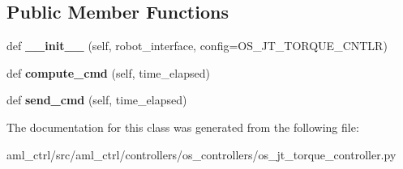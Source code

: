 \subsection*{Public Member Functions}
\begin{DoxyCompactItemize}
\item 
\hypertarget{classaml__ctrl_1_1controllers_1_1os__controllers_1_1os__jt__torque__controller_1_1_o_s_j_t_torque_controller_a6a9057f3af216e5baffb06f788cb3a7a}{}\label{classaml__ctrl_1_1controllers_1_1os__controllers_1_1os__jt__torque__controller_1_1_o_s_j_t_torque_controller_a6a9057f3af216e5baffb06f788cb3a7a} 
def {\bfseries \+\_\+\+\_\+init\+\_\+\+\_\+} (self, robot\+\_\+interface, config=O\+S\+\_\+\+J\+T\+\_\+\+T\+O\+R\+Q\+U\+E\+\_\+\+C\+N\+T\+LR)
\item 
\hypertarget{classaml__ctrl_1_1controllers_1_1os__controllers_1_1os__jt__torque__controller_1_1_o_s_j_t_torque_controller_ae53a96d9c5ad714a5f2bd8e7584093e7}{}\label{classaml__ctrl_1_1controllers_1_1os__controllers_1_1os__jt__torque__controller_1_1_o_s_j_t_torque_controller_ae53a96d9c5ad714a5f2bd8e7584093e7} 
def {\bfseries compute\+\_\+cmd} (self, time\+\_\+elapsed)
\item 
\hypertarget{classaml__ctrl_1_1controllers_1_1os__controllers_1_1os__jt__torque__controller_1_1_o_s_j_t_torque_controller_afe7e4b35075932fbaac675595bc94e55}{}\label{classaml__ctrl_1_1controllers_1_1os__controllers_1_1os__jt__torque__controller_1_1_o_s_j_t_torque_controller_afe7e4b35075932fbaac675595bc94e55} 
def {\bfseries send\+\_\+cmd} (self, time\+\_\+elapsed)
\end{DoxyCompactItemize}


The documentation for this class was generated from the following file\+:\begin{DoxyCompactItemize}
\item 
aml\+\_\+ctrl/src/aml\+\_\+ctrl/controllers/os\+\_\+controllers/os\+\_\+jt\+\_\+torque\+\_\+controller.\+py\end{DoxyCompactItemize}
